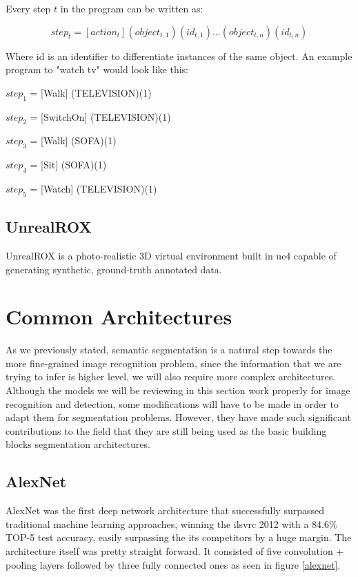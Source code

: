 Every step $t$ in the program can be written as:

\[ step_t = [action_t] (object_{t,1})(id_{t,1}) ... (object_{t,n})(id_{t,n}) \]

Where id is an identifier to differentiate instances of the same object. An example program to "watch tv" would look like this: 
\newline

$step_1$ = [Walk] (TELEVISION)(1)

$step_2$ = [SwitchOn] (TELEVISION)(1)

$step_3$ = [Walk] (SOFA)(1)

$step_4$ = [Sit] (SOFA)(1)

$step_5$ = [Watch] (TELEVISION)(1) \newline

\subsection{UnrealROX}
UnrealROX \cite{DBLP:journals/corr/abs-1810-06936} is a photo-realistic 3D virtual environment built in \gls{ue4} capable of generating synthetic, ground-truth annotated data.

\section{Common Architectures}
As we previously stated, semantic segmentation is a natural step towards the more fine-grained image recognition problem, since the information that we are trying to infer is higher level, we will also require more complex architectures. Although the models we will be reviewing in this section work properly for image recognition and detection, some modifications will have to be made in order to adapt them for segmentation problems. However, they have made such significant contributions to the field that they are still being used as the basic building blocks segmentation architectures.

\subsection{AlexNet}
AlexNet was the first deep network architecture that successfully surpassed traditional machine learning approaches, winning the \gls{ilsvrc} 2012 with a 84.6\% TOP-5 test accuracy, easily surpassing the its competitors by a huge margin. The architecture itself was pretty straight forward. It consisted of five convolution + pooling layers followed by three fully connected ones as seen in figure \ref{alexnet}.


